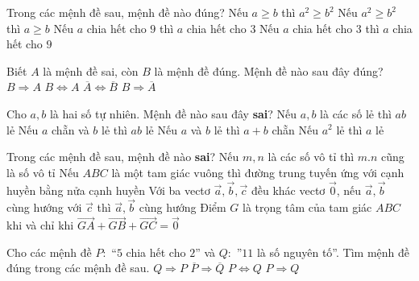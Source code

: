 \begin{ex}%
Trong các mệnh đề sau, mệnh đề nào đúng?
\choice
{Nếu $a\ge b$ thì $a^2\ge b^2$}
{Nếu $a^2 \ge b^2$ thì $a \ge b$}
{\True Nếu $a$ chia hết cho $9$ thì $a$ chia hết cho $3$}
{Nếu $a$ chia hết cho 3 thì $a$ chia hết cho $9$}
\end{ex}


\begin{ex}%
Biết $A$ là mệnh đề sai, còn $B$ là mệnh đề đúng. Mệnh đề nào sau đây đúng?
\choice 
{ $B\Rightarrow A$}
{ $B\Leftrightarrow A$ }
{ $\overline{A}\Leftrightarrow \overline{B}$ }
{ \True $B\Rightarrow \overline{A}$} 
\end{ex} 
\begin{ex}%
Cho $a,b$ là hai số tự  nhiên. Mệnh đề nào sau đây \textbf{sai}?
\choice
{Nếu $a, b$ là các số lẻ thì $ab$ lẻ}
{\True Nếu $a$ chẵn và $b$ lẻ thì $ab$ lẻ}
{Nếu $a$ và $b$ lẻ thì $a+b$ chẵn}
{Nếu $a^2$ lẻ thì $a$ lẻ} 
\end{ex}

\begin{ex}%
Trong các mệnh đề sau, mệnh đề nào \textbf{sai}?
\choice
{\True Nếu $m,n$ là các số vô tỉ thì $m.n$ cũng là số vô tỉ}
{Nếu $ABC$ là một tam giác vuông thì đường trung tuyến ứng với cạnh huyền bằng nửa cạnh huyền}
{Với ba vectơ $\overrightarrow{a},\overrightarrow{b},\overrightarrow{c}$ đều khác vectơ $\overrightarrow{0}$, nếu $\overrightarrow{a},\overrightarrow{b}$ cùng hướng với $\overrightarrow{c}$ thì $\overrightarrow{a},\overrightarrow{b}$ cùng hướng}
{Điểm $G$ là trọng tâm của tam giác $ABC$ khi và chỉ khi $\overrightarrow{GA}+\overrightarrow{GB}+\overrightarrow{GC}=\overrightarrow{0}$}
\end{ex}

\begin{ex}
Cho các mệnh đề $ P:$ “$5$ chia hết cho $2$” và $Q:$ ”$11$ là số nguyên tố”. Tìm mệnh đề đúng trong các mệnh đề sau.
\choice
{$Q \Rightarrow P$}
{$\overline{P} \Rightarrow \overline{Q}$}
{$P \Leftrightarrow Q$}
{\True $P \Rightarrow Q$}
\end{ex}

